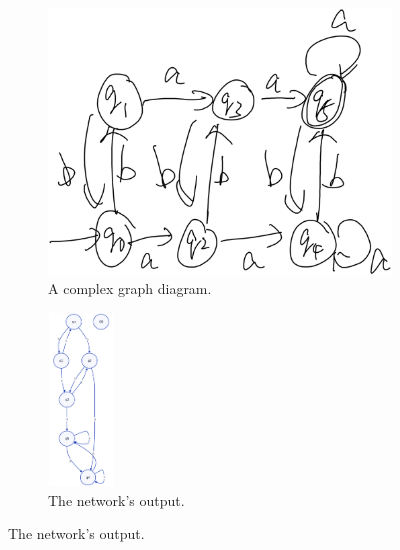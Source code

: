 \documentclass[conference]{IEEEtran}
\begin{document}
\begin{figure}[htbp]
	\begin{subfigure}[b]{0.45\linewidth}
		\includegraphics[width=\linewidth]{ex3.png}
		\caption{A complex graph diagram.}
	\end{subfigure}
	\hfill
	\begin{subfigure}[b]{0.45\linewidth}
		\includegraphics[width=50pt, height=130pt]{ex4.png}
		\caption{The network's output.}
	\end{subfigure}
	
	\vspace{1em}
	

\end{figure}
\end{document}
